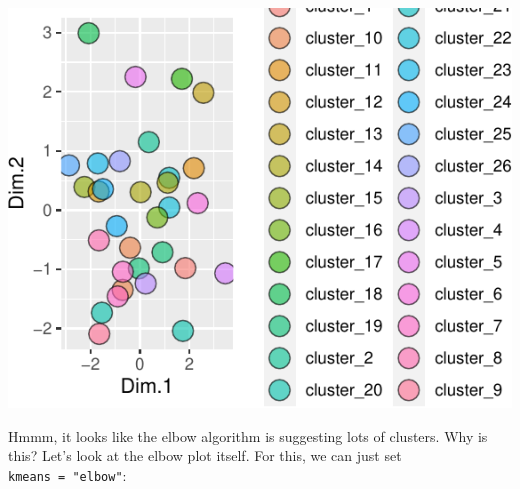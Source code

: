 \documentclass[
]{krantz}
\begin{document}
\begin{center}\includegraphics[width=0.8\linewidth]{index_files/figure-latex/unnamed-chunk-105-1} \end{center}

Hmmm, it looks like the elbow algorithm is suggesting lots of clusters. Why is this? Let's look at the elbow plot itself. For this, we can just set \texttt{kmeans\ =\ "elbow"}:
\end{document}
